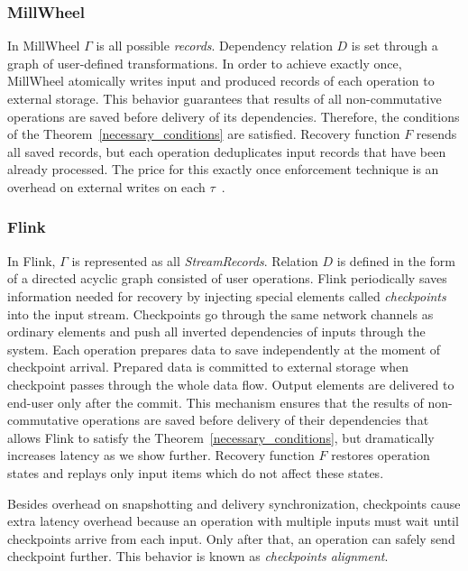 \subsubsection{MillWheel}

In MillWheel $\Gamma$ is all possible {\em records}. Dependency relation $D$ is set through a graph of user-defined transformations. In order to achieve exactly once, MillWheel atomically writes input and produced records of each operation to external storage. This behavior guarantees that results of all non-commutative operations are saved before delivery of its dependencies. Therefore, the conditions of the Theorem~\ref{necessary_conditions} are satisfied. Recovery function $F$ resends all saved records, but each operation deduplicates input records that have been already processed. The price for this exactly once enforcement technique is an overhead on external writes on each $\tau$~\cite{Akidau:2013:MFS:2536222.2536229}.    

\subsubsection{Flink}

In Flink, $\Gamma$ is represented as all {\em StreamRecords}. Relation $D$ is defined in the form of a directed acyclic graph consisted of user operations. Flink periodically saves information needed for recovery by injecting special elements called {\em checkpoints} into the input stream. Checkpoints go through the same network channels as ordinary elements and push all inverted dependencies of inputs through the system. Each operation prepares data to save independently at the moment of checkpoint arrival. Prepared data is committed to external storage when checkpoint passes through the whole data flow. Output elements are delivered to end-user only after the commit. This mechanism ensures that the results of non-commutative operations are saved before delivery of their dependencies that allows Flink to satisfy the Theorem~\ref{necessary_conditions}, but dramatically increases latency as we show further. Recovery function $F$ restores operation states and replays only input items which do not affect these states.

Besides overhead on snapshotting and delivery synchronization, checkpoints cause extra latency overhead because an operation with multiple inputs must wait until checkpoints arrive from each input. Only after that, an operation can safely send checkpoint further. This behavior is known as {\em checkpoints alignment}.


